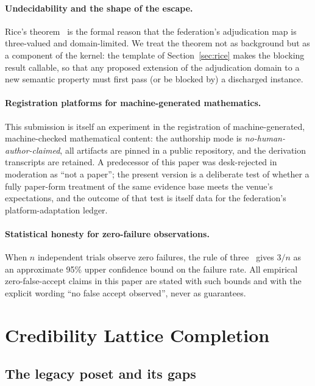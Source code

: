 \documentclass[11pt]{article}
\theoremstyle{definition}
\theoremstyle{remark}
\begin{document}
\paragraph{Undecidability and the shape of the escape.}
Rice's theorem~\cite{rice1953} is the formal reason that the federation's
adjudication map is three-valued and domain-limited. We treat the theorem not
as background but as a component of the kernel: the template of
Section~\ref{sec:rice} makes the blocking result callable, so that any
proposed extension of the adjudication domain to a new semantic property must
first pass (or be blocked by) a discharged instance.

\paragraph{Registration platforms for machine-generated mathematics.}
This submission is itself an experiment in the registration of
machine-generated, machine-checked mathematical content: the authorship mode
is \emph{no-human-author-claimed}, all artifacts are pinned in a public
repository, and the derivation transcripts are retained. A predecessor of
this paper was desk-rejected in moderation as ``not a paper''; the present
version is a deliberate test of whether a fully paper-form treatment of the
same evidence base meets the venue's expectations, and the outcome of that
test is itself data for the federation's platform-adaptation ledger.

\paragraph{Statistical honesty for zero-failure observations.}
When $n$ independent trials observe zero failures, the rule of
three~\cite{hanley1983} gives $3/n$ as an approximate 95\% upper confidence
bound on the failure rate. All empirical zero-false-accept claims in this
paper are stated with such bounds and with the explicit wording ``no false
accept observed'', never as guarantees.

\section{Credibility Lattice Completion}\label{sec:lattice}

\subsection{The legacy poset and its gaps}
\end{document}
